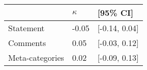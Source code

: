 \begin{tabular}{lll}
\hline
 & $\kappa$ & [95\% CI]  \\
\hline
Statement & -0.05 & [-0.14, 0.04] \\
Comments & 0.05 & [-0.03, 0.12] \\
Meta-categories & 0.02 & [-0.09, 0.13] \\
\hline
\end{tabular}
